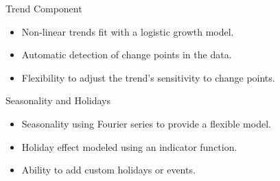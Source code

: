 \documentclass[aspectratio=169,hyperref={pdfpagelabels=false}]{beamer}
\begin{document}
\begin{frame}{Trend Component}
  \begin{itemize}
      \item Non-linear trends fit with a logistic growth model.
      \item Automatic detection of change points in the data.
      \item Flexibility to adjust the trend’s sensitivity to change points.
  \end{itemize}
\end{frame}


\begin{frame}{Seasonality and Holidays}
  \begin{itemize}
      \item Seasonality using Fourier series to provide a flexible model.
      \item Holiday effect modeled using an indicator function.
      \item Ability to add custom holidays or events.
  \end{itemize}
\end{frame}
\end{document}
